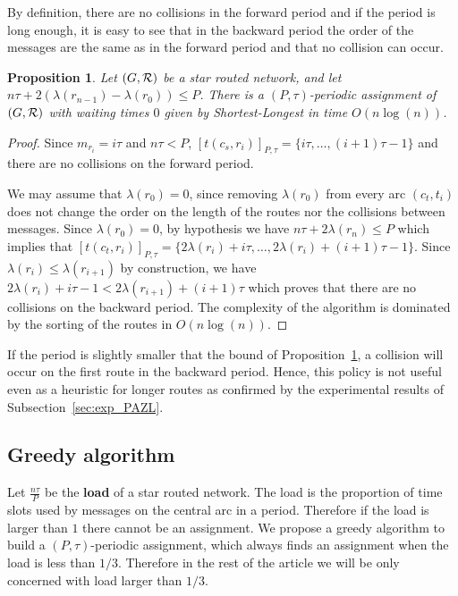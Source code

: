 \documentclass[10pt, conference, letterpaper]{IEEEtran}
\newtheorem{proposition}{Proposition}
\begin{document}
     By definition, there are no collisions in the forward period and if the period is long enough, 
     it is easy to see that in the backward period the order of the messages are the same as in the forward period and that no collision can occur. 
      
      
      \begin{proposition} Let $(G, {\cal R})$ be a star routed network, and let $n\tau + 2(\lambda(r_{n-1}) - \lambda(r_{0})) \leq P$. There is a $(P,\tau)$-periodic assignment of $(G, {\cal R})$ with waiting times $0$ given by Shortest-Longest in time $O(n\log(n))$.\label{prop:SL}
      \end{proposition}
      \begin{proof}
       Since $m_{r_i} = i\tau$ and $n\tau < P$, $[t(c_s,r_{i})]_{P,\tau} = \{i\tau,\dots, (i+1)\tau -1\}$ and there are no collisions on the forward period.
       
       We may assume that $\lambda(r_{0}) = 0$, since removing $\lambda(r_{0})$ from every arc $(c_t,t_i)$ does not change the order on the length of the routes nor the collisions between messages.
       Since $\lambda(r_{0}) = 0$, by hypothesis we have $n\tau + 2\lambda(r_{n}) \leq P$ which implies that
       $[t(c_t,r_{i})]_{P,\tau} = \{2 \lambda(r_{i}) + i\tau, \dots,  2 \lambda(r_{i}) + (i+1)\tau -1\}$.
       Since $ \lambda(r_{i}) \leq  \lambda(r_{i+1})$ by construction, we have  $2 \lambda(r_{i}) + i\tau -1 < 2 \lambda(r_{i+1}) + (i+1)\tau$ which proves that there are no collisions on the backward period. 
 The complexity of the algorithm is dominated by the sorting of the routes in $O(n\log(n))$. 
      \end{proof}

      If the period is slightly smaller that the bound of Proposition~\ref{prop:SL}, a collision will occur on the first route in the backward period. Hence, this policy is not useful even as a heuristic for longer routes as confirmed by the experimental results of Subsection~\ref{sec:exp_PAZL}. 

   
    \subsection{Greedy algorithm}
    
    
      Let $\frac{n\tau}{P}$ be the \textbf{load} of a star routed network. The load is the proportion of time slots used by messages on the central arc in a period. Therefore if the load is larger than $1$ there cannot be an assignment. We propose a greedy algorithm to build a $(P,\tau)$-periodic assignment, which always finds an assignment when the load is less than $1/3$. Therefore in the rest of the article we will be only concerned with load larger than $1/3$.
    
\end{document}
